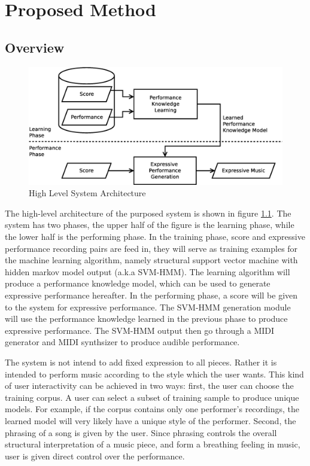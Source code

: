 \chapter{Proposed Method}
\label{chap:proposed}
\section{Overview}
      \begin{figure}[tp]
         \begin{center}
            \includegraphics[width=\textwidth]{fig/high_lev_arch}
         \end{center}
         \caption{High Level System Architecture} 
         \label{fig:flow}
      \end{figure}
The high-level architecture of the purposed system is shown in figure \ref{fig:flow}. The system has two phases, the upper half of the figure is the learning phase, while the lower half is the performing phase.  In the training phase, score and expressive performance recording pairs are feed in, they will serve as training examples for the machine learning algorithm, namely structural support vector machine with hidden markov model output (a.k.a SVM-HMM). The learning algorithm will produce a performance knowledge model, which can be used to generate expressive performance hereafter. In the performing phase, a score will be given to the system for expressive performance. The SVM-HMM generation module will use the performance knowledge learned in the previous phase to produce expressive performance. The SVM-HMM output then go through a MIDI generator and MIDI synthsizer to produce audible performance.

The system is not intend to add fixed expression to all pieces. Rather it is intended to perform music according to the style which the user wants. This kind of user interactivity can be achieved in two ways: first, the user can choose the training corpus. A user can select a subset of training sample to produce unique models. For example, if the corpus contains only one performer's recordings, the learned model will very likely have a unique style of the performer. Second, the phrasing of a song is given by the user. Since phrasing controls the overall structural interpretation of a music piece, and form a breathing feeling in music, user is given direct control over the performance.

